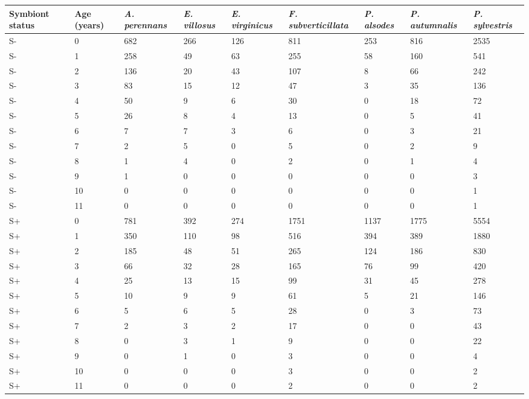 \documentclass[11pt]{article}
\begin{document}
	
\begin{landscape}
\begin{table}[ht]
	\centering
	\begin{tabular}{lllllllll}
		\hline
		Symbiont status & Age (years) & \textit{A. perennans} & \textit{E. villosus} & \textit{E. virginicus} & \textit{F. subverticillata} & \textit{P. alsodes} & \textit{P. autumnalis} & \textit{P. sylvestris} \\ 
		\hline
		S- & 0 & 682 & 266 & 126 & 811 & 253 & 816 & 2535 \\ 
		S- & 1 & 258 & 49 & 63 & 255 & 58 & 160 & 541 \\ 
		S- & 2 & 136 & 20 & 43 & 107 & 8 & 66 & 242 \\ 
		S- & 3 & 83 & 15 & 12 & 47 & 3 & 35 & 136 \\ 
		S- & 4 & 50 & 9 & 6 & 30 & 0 & 18 & 72 \\ 
		S- & 5 & 26 & 8 & 4 & 13 & 0 & 5 & 41 \\ 
		S- & 6 & 7 & 7 & 3 & 6 & 0 & 3 & 21 \\ 
		S- & 7 & 2 & 5 & 0 & 5 & 0 & 2 & 9 \\ 
		S- & 8 & 1 & 4 & 0 & 2 & 0 & 1 & 4 \\ 
		S- & 9 & 1 & 0 & 0 & 0 & 0 & 0 & 3 \\ 
		S- & 10 & 0 & 0 & 0 & 0 & 0 & 0 & 1 \\ 
		S- & 11 & 0 & 0 & 0 & 0 & 0 & 0 & 1 \\ 
		\hline
		S+ & 0 & 781 & 392 & 274 & 1751 & 1137 & 1775 & 5554 \\ 
		S+ & 1 & 350 & 110 & 98 & 516 & 394 & 389 & 1880 \\ 
		S+ & 2 & 185 & 48 & 51 & 265 & 124 & 186 & 830 \\ 
		S+ & 3 & 66 & 32 & 28 & 165 & 76 & 99 & 420 \\ 
		S+ & 4 & 25 & 13 & 15 & 99 & 31 & 45 & 278 \\ 
		S+ & 5 & 10 & 9 & 9 & 61 & 5 & 21 & 146 \\ 
		S+ & 6 & 5 & 6 & 5 & 28 & 0 & 3 & 73 \\ 
		S+ & 7 & 2 & 3 & 2 & 17 & 0 & 0 & 43 \\ 
		S+ & 8 & 0 & 3 & 1 & 9 & 0 & 0 & 22 \\ 
		S+ & 9 & 0 & 1 & 0 & 3 & 0 & 0 & 4 \\ 
		S+ & 10 & 0 & 0 & 0 & 3 & 0 & 0 & 2 \\ 
		S+ & 11 & 0 & 0 & 0 & 2 & 0 & 0 & 2 \\ 
		\hline
	\end{tabular}
\end{table}


\end{landscape}
\end{document}
